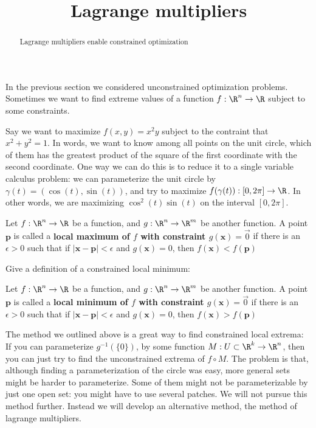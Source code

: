 \documentclass{ximera}
\title{Lagrange multipliers}
\begin{document}
	\begin{abstract}
		Lagrange multipliers enable constrained optimization
	\end{abstract}
	
	In the previous section we considered unconstrained optimization problems.  Sometimes we want to find extreme values of a function $f:\R^n \to \R$
	subject to some constraints.  
	
	\begin{example}
		Say we want to maximize $f(x,y) = x^2y$ subject to the contraint that $x^2+y^2=1$.  In  words, we want to know among all points on the unit circle,
		which of them has the greatest product of the square of the first coordinate with the second coordinate.  One way we can do this is to reduce it to a single variable
		calculus problem:  we can parameterize the unit circle by $\gamma(t) = (\cos(t),\sin(t))$, and try to maximize $f(\gamma(t)):[0,2\pi] \to \R$. In other words, we
		are maximizing $\cos^2(t)\sin(t)$ on the interval $[0,2\pi]$.
	\end{example}
	
	\begin{definition}
		Let $f:\R^n \to \R$ be a function, and $g:\R^n \to \R^m$ be another function.  A point $\mathbf{p}$ is called a \textbf{local maximum of $f$ with constraint 
		$g(\mathbf{x}) = \vec{0}$} if there is an $\epsilon>0$ such that if $|\mathbf{x}-\mathbf{p}| < \epsilon$ and $g(\mathbf{x}) = 0$, 
		then $f(\mathbf{x})<f(\mathbf{p})$
	\end{definition}
	
	Give a definition of a constrained local minimum:
	
	\begin{free-response}
		Let $f:\R^n \to \R$ be a function, and $g:\R^n \to \R^m$ be another function.  A point $\mathbf{p}$ is called a \textbf{local minimum of $f$ with constraint 
		$g(\mathbf{x}) = \vec{0}$} if there is an $\epsilon>0$ such that if $|\mathbf{x}-\mathbf{p}| < \epsilon$ and $g(\mathbf{x}) = 0$, 
		then $f(\mathbf{x})>f(\mathbf{p})$
	\end{free-response}
	
	The method we outlined above is a great way to find constrained local extrema: If you can parameterize $g^{-1}(\{0\})$, by some function
	 $M: U \subset \R^k \to \R^n$, 
	then you can just try to find the unconstrained extrema  of $f\circ M$.  The problem is that, although finding a parameterization of the circle was easy, more general
	sets might be harder to parameterize.  Some of them might not be parameterizable by just one open set:  you might have to use several patches.  We will not pursue
	this method further.  Instead we will develop an alternative method, the method of lagrange multipliers.
	
\end{document}
